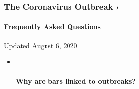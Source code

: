 \hypertarget{the-coronavirus-outbreak-}{%
\subsubsection{The Coronavirus Outbreak
›}\label{the-coronavirus-outbreak-}}

\hypertarget{frequently-asked-questions}{%
\paragraph{Frequently Asked
Questions}\label{frequently-asked-questions}}

Updated August 6, 2020

\begin{itemize}
\item ~
  \hypertarget{why-are-bars-linked-to-outbreaks}{%
  \paragraph{Why are bars linked to
  outbreaks?}\label{why-are-bars-linked-to-outbreaks}}


\end{itemize}
